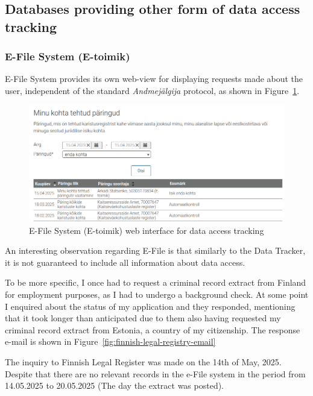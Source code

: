 \subsection{Databases providing other form of data access tracking}

\subsubsection{E-File System (E-toimik)}
E-File System provides its own web-view for displaying requests made about the user, independent of the standard \textit{Andmejälgija} protocol, as shown in Figure~\ref{fig:e-toimik}.

\begin{figure}[H]
\centering
\includegraphics[width=450px]{english/figures/e-toimik.png}
\caption{E-File System (E-toimik) web interface for data access tracking\cite{e-toimik-screenshot}}
\label{fig:e-toimik}
\end{figure}

An interesting observation regarding E-File is that similarly to the Data Tracker, it is not guaranteed to include all information about data access.

To be more specific, I once had to request a criminal record extract from Finland for employment purposes, as I had to undergo a background check. At some point I enquired about the status of my application and they responded, mentioning that it took longer than anticipated due to them also having requested my criminal record extract from Estonia, a country of my citizenship. The response e-mail is shown in Figure~\ref{fig:finnish-legal-registry-email}

The inquiry to Finnish Legal Register was made on the 14th of May, 2025. Despite that there are no relevant records in the e-File system in the period from 14.05.2025 to 20.05.2025 (The day the extract was posted).

